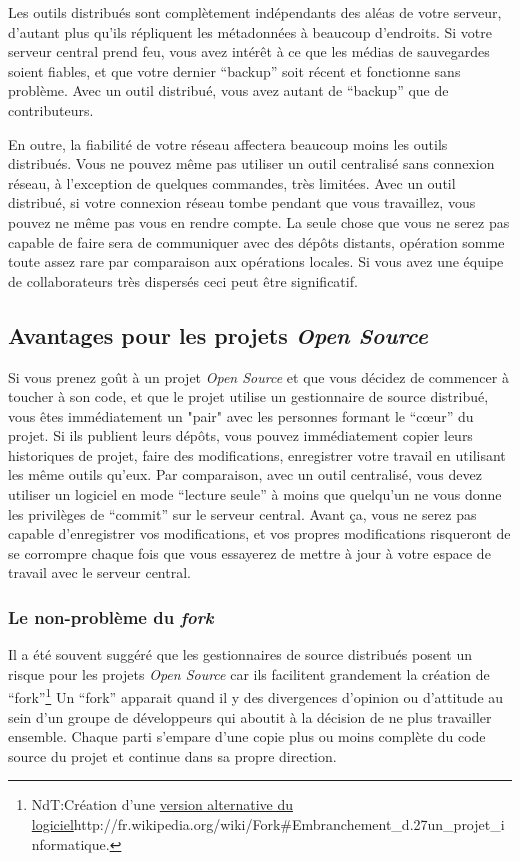 Les outils distribués sont complètement indépendants des aléas de votre serveur,
d'autant plus qu'ils répliquent les métadonnées à beaucoup d'endroits. Si
votre serveur central prend feu, vous avez intérêt à ce que les médias de 
sauvegardes soient fiables, et que votre dernier ``backup'' soit récent et
fonctionne sans problème. Avec un outil distribué, vous avez autant de 
``backup'' que de contributeurs.

En outre, la fiabilité de votre réseau affectera beaucoup moins les
outils distribués. Vous ne pouvez même pas utiliser un outil centralisé
sans connexion réseau, à l'exception de quelques commandes, très limitées. 
Avec un outil distribué, si votre connexion réseau tombe pendant que vous
travaillez, vous pouvez ne même pas vous en rendre compte. La seule chose
que vous ne serez pas capable de faire sera de communiquer avec des dépôts
distants, opération somme toute assez rare par comparaison aux opérations
locales. Si vous avez une équipe de collaborateurs très dispersés ceci peut
être significatif.

\subsection{Avantages pour les projets \textit{Open Source}}

Si vous prenez goût à un projet \textit{Open Source} et que vous
décidez de commencer à toucher à son code, et que le projet utilise
un gestionnaire de source distribué, vous êtes immédiatement un "pair"
avec les personnes formant le ``cœur'' du projet. Si ils publient
leurs dépôts, vous pouvez immédiatement copier leurs historiques de
projet, faire des modifications, enregistrer votre travail en utilisant
les même outils qu'eux. Par comparaison, avec un outil centralisé, vous
devez utiliser un logiciel en mode ``lecture seule'' à moins que 
quelqu'un ne vous donne les privilèges de ``commit'' sur le serveur
central. Avant ça, vous ne serez pas capable d'enregistrer vos 
modifications, et vos propres modifications risqueront de se 
corrompre chaque fois que vous essayerez de mettre à jour à votre
espace de travail avec le serveur central.

\subsubsection{Le non-problème du \textit{fork}}

Il a été souvent suggéré que les gestionnaires de source distribués
posent un risque pour les projets \textit{Open Source} car ils 
facilitent grandement la création de ``fork''\footnote{NdT:Création 
d'une 
\url{version alternative du logiciel}{http://fr.wikipedia.org/wiki/Fork#Embranchement_d.27un_projet_informatique}.}
Un ``fork'' apparait quand il y des divergences d'opinion ou d'attitude
au sein d'un groupe de développeurs qui aboutit à la décision de ne 
plus travailler ensemble. Chaque parti s'empare d'une copie plus ou moins
complète du code source du projet et continue dans sa propre direction.

